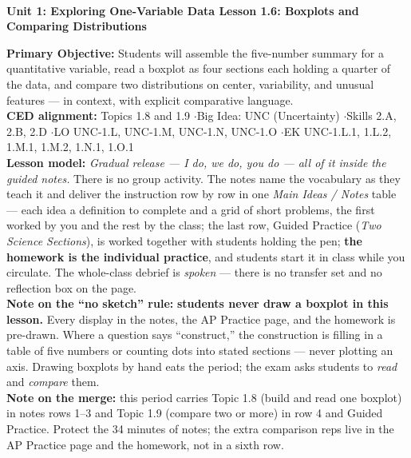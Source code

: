 \documentclass[10pt]{article}
\newcommand{\UnitNumberName}{Unit 1: Exploring One-Variable Data \quad}
\newcommand{\LessonNumberName}{Lesson 1.6: Boxplots and Comparing Distributions}
\begin{document}
\begin{center}
    {\Large\bfseries \CourseName \\
    {\small\bfseries \UnitNumberName \LessonNumberName}}
\end{center}

\begin{tcolorbox}[colback=sky, colframe=navy, boxrule=0.9pt, arc=2mm,
    left=2mm, right=2mm, top=1.5mm, bottom=1.5mm]
    \textbf{Primary Objective:} Students will assemble the five-number summary for a quantitative
    variable, read a boxplot as four sections each holding a quarter of the data, and compare two
    distributions on center, variability, and unusual features --- in context, with explicit
    comparative language.
    \\[2pt]
    \textbf{CED alignment:} Topics 1.8 and 1.9 \quad$\cdot$\quad Big Idea: UNC (Uncertainty)
    \quad$\cdot$\quad Skills 2.A, 2.B, 2.D \quad$\cdot$\quad LO UNC-1.L, UNC-1.M, UNC-1.N,
    UNC-1.O \quad$\cdot$\quad EK UNC-1.L.1, 1.L.2, 1.M.1, 1.M.2, 1.N.1, 1.O.1
    \\[2pt]
    \textbf{Lesson model:} \emph{Gradual release --- I do, we do, you do --- all of it inside
    the guided notes.} There is no group activity. The notes name the vocabulary as they teach
    it and deliver the instruction row by row in one \emph{Main Ideas / Notes} table --- each
    idea a definition to complete and a grid of short problems, the first worked by you and the
    rest by the class; the last row, Guided Practice (\emph{Two Science Sections}), is worked
    together with students holding the pen; \textbf{the homework is the individual practice}, and
    students start it in class while you circulate. The whole-class debrief is \emph{spoken} ---
    there is no transfer set and no reflection box on the page.
    \\[2pt]
    \textbf{Note on the ``no sketch'' rule:} \textbf{students never draw a boxplot in this
    lesson.} Every display in the notes, the AP Practice page, and the homework is pre-drawn.
    Where a question says ``construct,'' the construction is filling in a table of five numbers
    or counting dots into stated sections --- never plotting an axis. Drawing boxplots by hand
    eats the period; the exam asks students to \emph{read} and \emph{compare} them.
    \\[2pt]
    \textbf{Note on the merge:} this period carries Topic 1.8 (build and read one boxplot) in
    notes rows 1--3 and Topic 1.9 (compare two or more) in row 4 and Guided Practice. Protect
    the 34 minutes of notes; the extra comparison reps live in the AP Practice page and the
    homework, not in a sixth row.
\end{tcolorbox}
\end{document}
